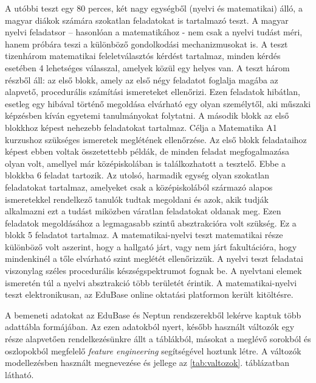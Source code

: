 \documentclass[12pt]{article}
\begin{document}
A utóbbi teszt egy 80 perces, két nagy egységből (nyelvi és matematikai) álló, a magyar diákok számára szokatlan feladatokat is tartalmazó teszt. A magyar nyelvi feladatsor – hasonlóan a matematikához - nem csak a nyelvi tudást méri, hanem próbára teszi a különböző gondolkodási mechanizmusokat is. A teszt tizenhárom matematikai feleletválasztós kérdést tartalmaz, minden kérdés esetében 4 lehetséges válasszal, amelyek közül egy helyes van. A teszt három részből áll: az első blokk, amely az első négy feladatot foglalja magába az alapvető, procedurális számítási ismereteket ellenőrizi. Ezen feladatok hibátlan, esetleg egy hibával történő megoldása elvárható egy olyan személytől, aki műszaki képzésben kíván egyetemi tanulmányokat folytatni. A második blokk az első blokkhoz képest nehezebb feladatokat tartalmaz. Célja a Matematika A1 kurzushoz szükséges ismeretek meglétének ellenőrzése. Az első blokk feladataihoz képest ebben voltak összetettebb példák, de minden feladat megfogalmazása olyan volt, amellyel már középiskolában is találkozhatott a tesztelő. Ebbe a blokkba 6 feladat tartozik. Az utolsó, harmadik egység olyan szokatlan feladatokat tartalmaz, amelyeket csak a középiskolából származó alapos ismeretekkel rendelkező tanulók tudtak megoldani és azok, akik tudják alkalmazni ezt a tudást miközben váratlan feladatokat oldanak meg. Ezen feladatok megoldásához a legmagasabb szintű absztrakcióra volt szükség. Ez a blokk 5 feladatot tartalmaz. A matematikai-nyelvi teszt matematikai része különböző volt aszerint, hogy a hallgató járt, vagy nem járt fakultációra, hogy mindenkinél a tőle elvárható szint meglétét ellenőrizzük. A nyelvi teszt feladatai viszonylag széles procedurális készségspektrumot fognak be. A nyelvtani elemek ismeretén túl a nyelvi absztrakció több területét érintik. A matematikai-nyelvi teszt elektronikusan, az EduBase online oktatási platformon került kitöltésre.

A bemeneti adatokat az EduBase és Neptun rendszerekből lekérve kaptuk több adattábla formájában. Az ezen adatokból nyert, később használt változók egy része alapvetően rendelkezésünkre állt a táblákból, másokat a meglévő sorokból és oszlopokból megfelelő \textit{feature engineering} segítségével hoztunk létre. A változók modellezésben használt megnevezése és jellege az \ref{tab:valtozok}. táblázatban látható.
\end{document}
